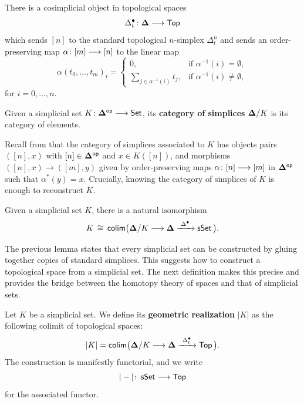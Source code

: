 \begin{proposition}
    There is a cosimplicial object in topological spaces
    \begin{equation}
        \Delta^{\bullet}_{t} \colon \mathbf\Delta \longrightarrow \operatorname{\mathsf{Top}}
    \end{equation}
    which sends $[n]$ to the standard topological $n$-simplex $\Delta^n_{t}$ and sends an order-preserving map $\alpha\colon [m] \longrightarrow [n]$ to the linear map
    \begin{equation}
        \alpha(t_0,\ldots,t_m)_i = 
        \begin{cases}
            0, & \text{if } \alpha^{-1}(i) = \emptyset, \\
            \displaystyle\sum_{j\in \alpha^{-1}(i)} t_j, & \text{if } \alpha^{-1}(i) \neq \emptyset,    
        \end{cases}
    \end{equation}
    for $i=0,\ldots,n$.
\end{proposition}

\begin{definition}
    Given a simplicial set $K\colon \mathbf\Delta^{\mathsf{op}} \longrightarrow \operatorname{{\mathsf{Set}}}$, its \textbf{category of simplices} $\mathbf\Delta / K$ is its category of elements.
\end{definition}

Recall from  that the category of simplices associated to $K$ has objects pairs $([n],x)$ with $[n]\in \mathbf\Delta^{\mathsf{op}}$ and $x\in K([n])$, and morphisms $([n],x)\to([m],y)$ given by order-preserving maps $\alpha \colon [n] \longrightarrow [m]$ in $\mathbf\Delta^{\mathsf{op}}$ such that $\alpha^\ast(y) = x$. Crucially, knowing the category of simplices of $K$ is enough to reconstruct $K$.

\begin{lemma}
    Given a simplicial set $K$, there is a natural isomorphism 
    \begin{equation}
        K \,\cong\, \mathsf{colim}\big( \mathbf\Delta / K \longrightarrow \mathbf\Delta \xrightarrow{\,\,\Delta^\bullet\,\,} \operatorname{\sf sSet} \big).
    \end{equation}
\end{lemma}

The previous lemma states that every simplicial set can be constructed by gluing together copies of standard simplices. This suggests how to construct a topological space from a simplicial set. The next definition makes this precise and provides the bridge between the homotopy theory of spaces and that of simplicial sets.

\begin{definition}
    Let $K$ be a simplicial set. We define its \textbf{geometric realization} $|K|$ as the following colimit of topological spaces:
    \begin{equation}
        |K| = \mathsf{colim}\big(\mathbf\Delta / K \longrightarrow \mathbf\Delta \xrightarrow{\,\,\Delta^\bullet_{t}\,\,} \operatorname{\mathsf{Top}}\big).
    \end{equation}
    The construction is manifestly functorial, and we write
    \begin{equation}\label{ch2:: eq: geometric real}
        |-| \colon \operatorname{\sf sSet} \longrightarrow \operatorname{\mathsf{Top}}
    \end{equation}
    for the associated functor.
\end{definition}


